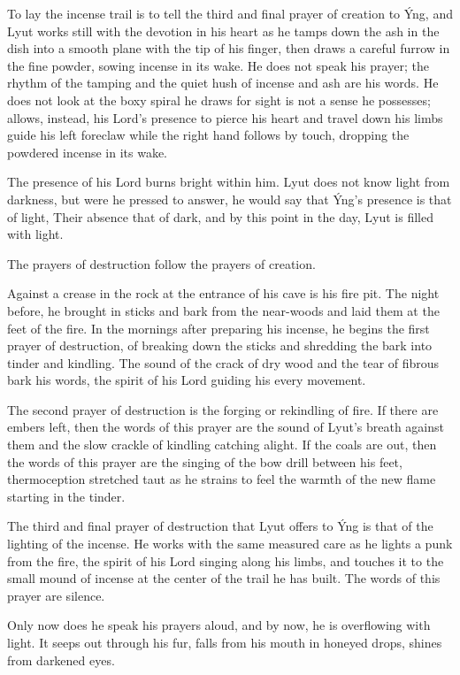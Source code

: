 To lay the incense trail is to tell the third and final prayer of creation to Ýng, and Lyut works still with the devotion in his heart as he tamps down the ash in the dish into a smooth plane with the tip of his finger, then draws a careful furrow in the fine powder, sowing incense in its wake. He does not speak his prayer; the rhythm of the tamping and the quiet hush of incense and ash are his words. He does not look at the boxy spiral he draws for sight is not a sense he possesses; allows, instead, his Lord's presence to pierce his heart and travel down his limbs guide his left foreclaw while the right hand follows by touch, dropping the powdered incense in its wake.

The presence of his Lord burns bright within him. Lyut does not know light from darkness, but were he pressed to answer, he would say that Ýng's presence is that of light, Their absence that of dark, and by this point in the day, Lyut is filled with light.

The prayers of destruction follow the prayers of creation.

Against a crease in the rock at the entrance of his cave is his fire pit. The night before, he brought in sticks and bark from the near-woods and laid them at the feet of the fire. In the mornings after preparing his incense, he begins the first prayer of destruction, of breaking down the sticks and shredding the bark into tinder and kindling. The sound of the crack of dry wood and the tear of fibrous bark his words, the spirit of his Lord guiding his every movement.

The second prayer of destruction is the forging or rekindling of fire. If there are embers left, then the words of this prayer are the sound of Lyut's breath against them and the slow crackle of kindling catching alight. If the coals are out, then the words of this prayer are the singing of the bow drill between his feet, thermoception stretched taut as he strains to feel the warmth of the new flame starting in the tinder.

The third and final prayer of destruction that Lyut offers to Ýng is that of the lighting of the incense. He works with the same measured care as he lights a punk from the fire, the spirit of his Lord singing along his limbs, and touches it to the small mound of incense at the center of the trail he has built. The words of this prayer are silence.

Only now does he speak his prayers aloud, and by now, he is overflowing with light. It seeps out through his fur, falls from his mouth in honeyed drops, shines from darkened eyes.

